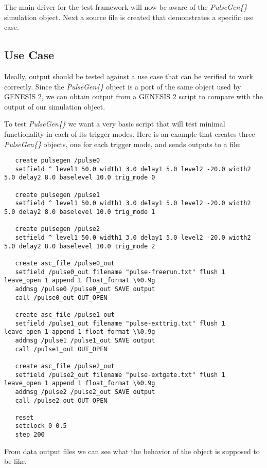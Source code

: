 \documentclass[12pt]{article}
\begin{document}
The main driver for the test framework will now be aware of the {\it PulseGen\{\}} simulation object. Next a source file is created that demonstrates a specific use case.

\subsection*{Use Case}

Ideally, output should be tested against a use case that can be verified to work correctly. Since the {\it PulseGen\{\}} object is a port of the same object used by GENESIS 2, we can obtain output from a GENESIS 2 script to compare with the output of our simulation object.

To test {\it PulseGen\{\}} we want a very basic script that will test minimal functionality in each of its trigger modes. Here is an example that creates three {\it PulseGen\{\}} objects, one for each trigger mode, and sends outputs to a file:
\begin{verbatim}
   create pulsegen /pulse0
   setfield ^ level1 50.0 width1 3.0 delay1 5.0 level2 -20.0 width2 5.0 delay2 8.0 baselevel 10.0 trig_mode 0

   create pulsegen /pulse1
   setfield ^ level1 50.0 width1 3.0 delay1 5.0 level2 -20.0 width2 5.0 delay2 8.0 baselevel 10.0 trig_mode 1

   create pulsegen /pulse2
   setfield ^ level1 50.0 width1 3.0 delay1 5.0 level2 -20.0 width2 5.0 delay2 8.0 baselevel 10.0 trig_mode 2

   create asc_file /pulse0_out 
   setfield /pulse0_out filename "pulse-freerun.txt" flush 1 leave_open 1 append 1 float_format \%0.9g
   addmsg /pulse0 /pulse0_out SAVE output
   call /pulse0_out OUT_OPEN

   create asc_file /pulse1_out 
   setfield /pulse1_out filename "pulse-exttrig.txt" flush 1 leave_open 1 append 1 float_format \%0.9g
   addmsg /pulse1 /pulse1_out SAVE output
   call /pulse1_out OUT_OPEN

   create asc_file /pulse2_out 
   setfield /pulse2_out filename "pulse-extgate.txt" flush 1 leave_open 1 append 1 float_format \%0.9g
   addmsg /pulse2 /pulse2_out SAVE output
   call /pulse2_out OUT_OPEN

   reset
   setclock 0 0.5
   step 200
\end{verbatim}

From data output files we can see what the behavior of the object is supposed to be like.

\begin{figure}[ht]
  \centering
\end{figure}
\end{document}
